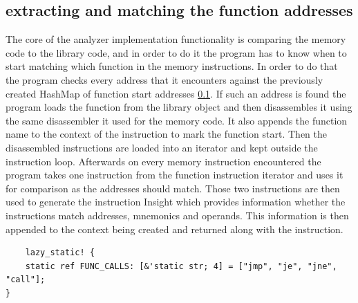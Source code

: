 \subsection{extracting and matching the function addresses}

The core of the analyzer implementation functionality is comparing the memory code to the library code, and in order to do it the program has to know when to start matching which function in the memory instructions. 
In order to do that the program checks every address that it encounters against the previously created HashMap of function start addresses \ref{}.
If such an address is found the program loads the function from the library object and then disassembles it using the same disassembler it used for the memory code.
It also appends the function name to the context of the instruction to mark the function start.
Then the disassembled instructions are loaded into an iterator and kept outside the instruction loop.
Afterwards on every memory instruction encountered the program takes one instruction from the function instruction iterator and uses it for comparison as the addresses should match. 
Those two instructions are then used to generate the instruction Insight which provides information whether the instructions match addresses, mnemonics and operands.
This information is then appended to the context being created and returned along with the instruction.

\begin{lstlisting}
    lazy_static! {
    static ref FUNC_CALLS: [&'static str; 4] = ["jmp", "je", "jne", "call"];
}

\end{lstlisting}

